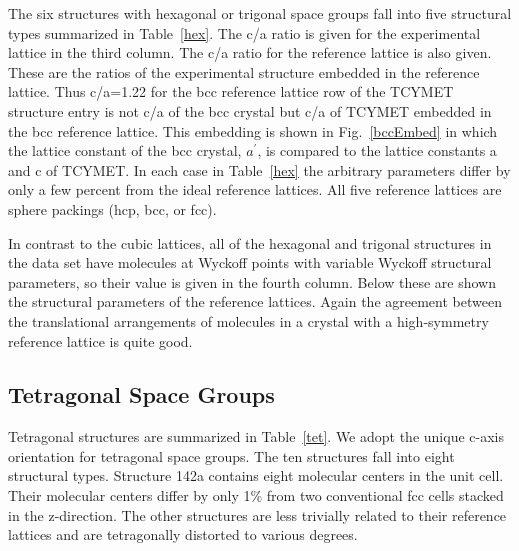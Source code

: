 \documentclass[preprint]{revtex4}              %
\begin{document}
The six structures with hexagonal or trigonal space groups fall into
five structural types summarized in Table~\ref{hex}.  The c/a ratio
is given for the experimental lattice in the third column. The c/a
ratio for the reference lattice is also given.  These are the ratios
of the experimental structure embedded in the reference lattice.
Thus c/a=1.22 for the bcc reference lattice row of the TCYMET
structure entry is not c/a of the bcc crystal but c/a of TCYMET
embedded in the bcc reference lattice. This embedding is shown in
Fig.\ \ref{bccEmbed} in which the lattice constant of the bcc
crystal, $a^\prime$, is compared to the lattice constants a and c of
TCYMET. In each case in Table~\ref{hex} the arbitrary parameters
differ by only a few percent from the ideal reference lattices. All
five reference lattices are sphere packings (hcp, bcc, or fcc).

In contrast to the cubic lattices, all of the hexagonal and trigonal
structures in the data set have molecules at Wyckoff points with
variable Wyckoff structural parameters, so their value is given in
the fourth column. Below these are shown the structural parameters
of the reference lattices.  Again the agreement between the
translational arrangements of molecules in a crystal with a
high-symmetry reference lattice is quite good.

\subsection{Tetragonal Space Groups}
\label{sec:tet}

Tetragonal structures are summarized in Table~\ref{tet}. We adopt
the unique c-axis orientation for tetragonal space groups. The ten
structures fall into eight structural types. Structure 142a contains
eight molecular centers in the unit cell.  Their molecular centers
differ by only 1\% from two conventional fcc cells stacked in the
z-direction.  The other structures are less trivially related to
their reference lattices and are tetragonally distorted to various
degrees.
\end{document}
